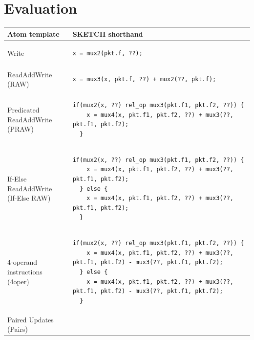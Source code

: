 \section{Evaluation}
\label{s:eval}

\begin{table}[!t]
  \begin{scriptsize}
  \begin{tabular}{|p{}|p{}|}
  \hline
  Atom template & SKETCH shorthand\\
  \hline
  Write &
  {\begin{lstlisting}[style=customctable]
  x = mux2(pkt.f, ??);
  \end{lstlisting}} \\
  \hline
  ReadAddWrite (RAW) &
  {\begin{lstlisting}[style=customctable]
  x = mux3(x, pkt.f, ??) + mux2(??, pkt.f);
  \end{lstlisting}} \\
  \hline
  \pbox{0.15\textwidth}
  {Predicated\\
  ReadAddWrite (PRAW)} &
  {\begin{lstlisting}[style=customctable]
  if(mux2(x, ??) rel_op mux3(pkt.f1, pkt.f2, ??)) {
    x = mux4(x, pkt.f1, pkt.f2, ??) + mux3(??, pkt.f1, pkt.f2);
  }
  \end{lstlisting}} \\
  \hline
  \pbox{0.15\textwidth}
  {If-Else\\
   ReadAddWrite\\
   (If-Else RAW)} &
  {\begin{lstlisting}[style=customctable]
  if(mux2(x, ??) rel_op mux3(pkt.f1, pkt.f2, ??)) {
    x = mux4(x, pkt.f1, pkt.f2, ??) + mux3(??, pkt.f1, pkt.f2);
  } else {
    x = mux4(x, pkt.f1, pkt.f2, ??) + mux3(??, pkt.f1, pkt.f2);
  }
  \end{lstlisting}} \\
  \hline
  \pbox{0.15\textwidth}
  {4-operand instructions\\
   (4oper)} &
  {\begin{lstlisting}[style=customctable]
  if(mux2(x, ??) rel_op mux3(pkt.f1, pkt.f2, ??)) {
    x = mux4(x, pkt.f1, pkt.f2, ??) + mux3(??, pkt.f1, pkt.f2) - mux3(??, pkt.f1, pkt.f2);
  } else { 
    x = mux4(x, pkt.f1, pkt.f2, ??) + mux3(??, pkt.f1, pkt.f2) - mux3(??, pkt.f1, pkt.f2);
  }
  \end{lstlisting}} \\
  \hline
  Paired Updates (Pairs) &
  {\begin{lstlisting}[style=customctable]

\end{lstlisting}}
\end{tabular}
\end{scriptsize}
\end{table}
